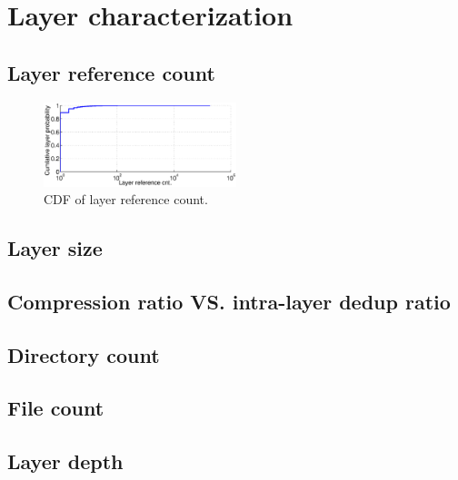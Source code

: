 \section{Layer characterization}
\label{sec:redundant_layers}

\subsection{Layer reference count}

\begin{figure}
	\centering
	\includegraphics[width=0.5\textwidth]{graphs/shared_cnt}
	\caption{CDF of layer reference count.
	}
	\label{fig:reference-cnt}
\end{figure}

\subsection{Layer size}


\subsection{Compression ratio VS. intra-layer dedup ratio}


\subsection{Directory count}

\subsection{File count}

\subsection{Layer depth}
